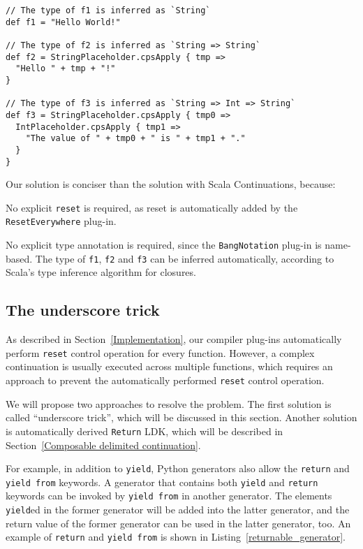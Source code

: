\begin{lstlisting}[caption={The translated source code of \lstinline{Dsl.scala}-base solution of \lstinline{printf} problem},label={transformed-printf}]
// The type of f1 is inferred as `String`
def f1 = "Hello World!"

// The type of f2 is inferred as `String => String`
def f2 = StringPlaceholder.cpsApply { tmp =>
  "Hello " + tmp + "!"
}

// The type of f3 is inferred as `String => Int => String`
def f3 = StringPlaceholder.cpsApply { tmp0 =>
  IntPlaceholder.cpsApply { tmp1 =>
    "The value of " + tmp0 + " is " + tmp1 + "."
  }
}
\end{lstlisting}

Our solution is conciser than the solution with Scala Continuations, because:
\begin{enumerate*}
  \item No explicit \lstinline{reset} is required, as reset is automatically added by the \lstinline{ResetEverywhere} plug-in.
  \item No explicit type annotation is required, since the \lstinline{BangNotation} plug-in is name-based. The type of \lstinline{f1}, \lstinline{f2} and \lstinline{f3} can be inferred automatically, according to Scala's type inference algorithm for closures.
\end{enumerate*}

\subsection{The underscore trick}\label{The underscore trick}

As described in Section~\ref{Implementation}, our compiler plug-ins automatically perform \lstinline{reset} control operation for every function. However, a complex continuation is usually executed across multiple functions, which requires an approach to prevent the automatically performed \lstinline{reset} control operation.

We will propose two approaches to resolve the problem. The first solution is called ``underscore trick'', which will be discussed in this section. Another solution is automatically derived \lstinline{Return} LDK, which will be described in Section~\ref{Composable delimited continuation}.

For example, in addition to \lstinline{yield}, Python generators also allow the \lstinline{return} and \lstinline{yield from} keywords. A generator that contains both \lstinline{yield} and \lstinline{return} keywords can be invoked by \lstinline{yield from} in another generator. The elements \lstinline{yield}ed in the former generator will be added into the latter generator, and the return value of the former generator can be used in the latter generator, too. An example of \lstinline{return} and \lstinline{yield from} is shown in Listing~\ref{returnable_generator}.

